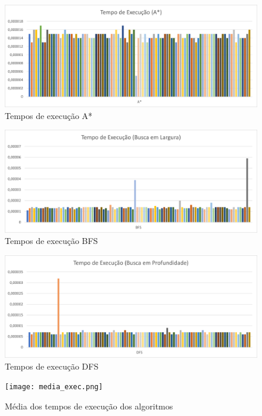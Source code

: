 \documentclass[12pt, a4paper]{article}
\begin{document}
\begin{figure}[!h]
    \centering
    \includegraphics[width=.85\textwidth]{images/tempo_exec_a_star.png}
    \caption{Tempos de execução A*}
    \label{fig:tempo_exec_}
\end{figure}

\begin{figure}[!h]
    \centering
    \includegraphics[width=.85\textwidth]{images/tempo_exec_bfs.png}
    \caption{Tempos de execução BFS}
    \label{fig:tempo_exec_bfs}
\end{figure}

\begin{figure}[!h]
    \centering
    \includegraphics[width=.85\textwidth]{images/tempo_exec_dfs.png}
    \caption{Tempos de execução DFS}
    \label{fig:tempo_exec_dfs}
\end{figure}

\cleardoublepage%

\begin{figure}[!h]
    \centering
    \texttt{[image: media\_exec.png]}
    \caption{Média dos tempos de execução dos algoritmos}
    \label{fig:tempo}
\end{figure}
\end{document}
